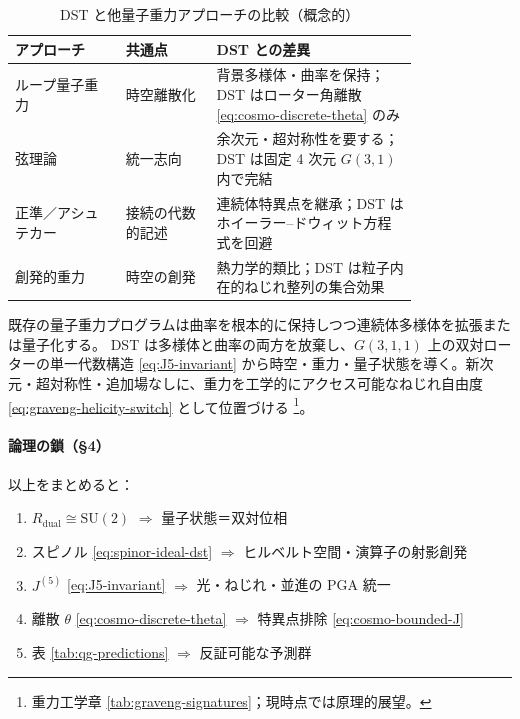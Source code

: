 \documentclass[dvipdfmx,a4paper,oneside]{jsbook}
\numberwithin{equation}{chapter}
\begin{document}
\begin{table}[htbp]
  \centering
  \caption{DST と他量子重力アプローチの比較（概念的）}
  \label{tab:qg-comparison}
  \begin{tabular}{@{}p{0.22\linewidth}p{0.18\linewidth}p{0.40\linewidth}@{}}
    \toprule
    アプローチ & 共通点 & DST との差異 \\
    \midrule
    ループ量子重力 &
    時空離散化 &
    背景多様体・曲率を保持；DST はローター角離散 \eqref{eq:cosmo-discrete-theta} のみ \\
    弦理論 &
    統一志向 &
    余次元・超対称性を要する；DST は固定 4 次元 \(G(3,1)\) 内で完結 \\
    正準／アシュテカー &
    接続の代数的記述 &
    連続体特異点を継承；DST はホイーラー--ドウィット方程式を回避 \\
    創発的重力 &
    時空の創発 &
    熱力学的類比；DST は粒子内在的ねじれ整列の集合効果 \\
    \bottomrule
  \end{tabular}
\end{table}

既存の量子重力プログラムは曲率を根本的に保持しつつ連続体多様体を拡張または量子化する。
DST は多様体と曲率の両方を放棄し、\(G(3,1,1)\) 上の双対ローターの単一代数構造 \eqref{eq:J5-invariant} から時空・重力・量子状態を導く。新次元・超対称性・追加場なしに、重力を工学的にアクセス可能なねじれ自由度 \eqref{eq:graveng-helicity-switch} として位置づける \footnote{重力工学章 \eqref{tab:graveng-signatures}；現時点では原理的展望。}。

\paragraph{論理の鎖（§4）}
以上をまとめると：
\begin{enumerate}[leftmargin=2em]
  \item \(R_{\mathrm{dual}} \cong \mathrm{SU}(2)\) \(\Rightarrow\) 量子状態＝双対位相
  \item スピノル \eqref{eq:spinor-ideal-dst} \(\Rightarrow\) ヒルベルト空間・演算子の射影創発
  \item \(J^{(5)}\) \eqref{eq:J5-invariant} \(\Rightarrow\) 光・ねじれ・並進の PGA 統一
  \item 離散 \(\theta\) \eqref{eq:cosmo-discrete-theta} \(\Rightarrow\) 特異点排除 \eqref{eq:cosmo-bounded-J}
  \item 表 \ref{tab:qg-predictions} \(\Rightarrow\) 反証可能な予測群
\end{enumerate}
\end{document}
